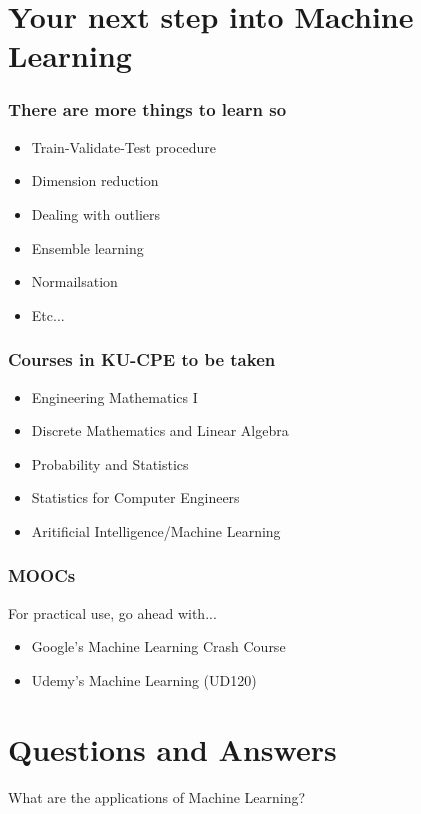 \documentclass[aspectratio=169]{beamer}
\begin{document}
\section{Your next step into Machine Learning}

\begin{frame}
	\frametitle{There are more things to learn so}
	\begin{itemize}
		\item<2-> Train-Validate-Test procedure
		\item<3-> Dimension reduction
		\item<4-> Dealing with outliers
		\item<5-> Ensemble learning
		\item<6-> Normailsation
		\item<7-> Etc...
	\end{itemize}
\end{frame}

\begin{frame}
	\frametitle{Courses in KU-CPE to be taken}
	\begin{itemize}
		\item Engineering Mathematics I
		\item Discrete Mathematics and Linear Algebra
		\item Probability and Statistics
		\item Statistics for Computer Engineers
		\item Aritificial Intelligence/Machine Learning
	\end{itemize}
\end{frame}

\begin{frame}
	\frametitle{MOOCs}
	For practical use, go ahead with...
	\begin{itemize}
		\item Google's Machine Learning Crash Course
		\item Udemy's Machine Learning (UD120)
	\end{itemize}
\end{frame}

\section{Questions and Answers}

\begin{frame}
	\begin{center}
		\Large What are the applications of Machine Learning?
	\end{center}
\end{frame}
\end{document}
